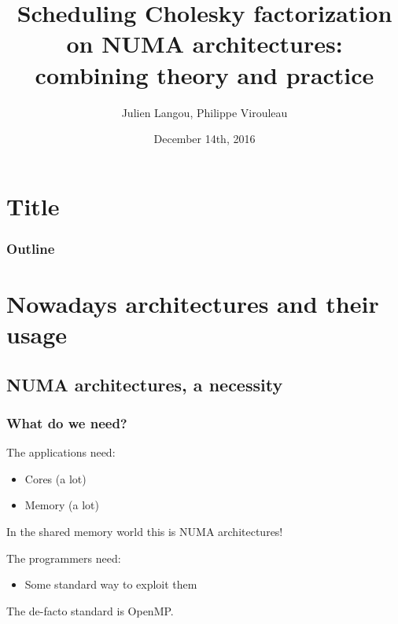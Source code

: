 \documentclass[xcolor={usenames,dvipsnames,svgnames,table}, aspectratio=43]{beamer}
\title[Séminaire au vert]{Scheduling Cholesky factorization on NUMA architectures: combining theory and practice}
\author[J. Langou, P. Virouleau]{
Julien Langou, Philippe Virouleau}
\institute[CORSE/AVALON]{Inria - CORSE/AVALON teams}
\date{December 14th, 2016}
\begin{document}



\section*{Title}
\mymaketitle

\begin{frame}
  \frametitle{Outline}
  \tableofcontents%
\end{frame}



\section{Nowadays architectures and their usage}

\subsection{NUMA architectures, a necessity}

\begin{frame}
\frametitle{What do we need?}
\begin{block}{The applications need:}
    \begin{itemize}
      \item Cores (a lot)
      \item Memory (a lot)
    \end{itemize}
    In the shared memory world this is NUMA architectures!
\end{block}

\begin{block}{The programmers need:}
    \begin{itemize}
      \item Some standard way to exploit them
    \end{itemize}
    The de-facto standard is OpenMP.
\end{block}
\end{frame}
\end{document}
